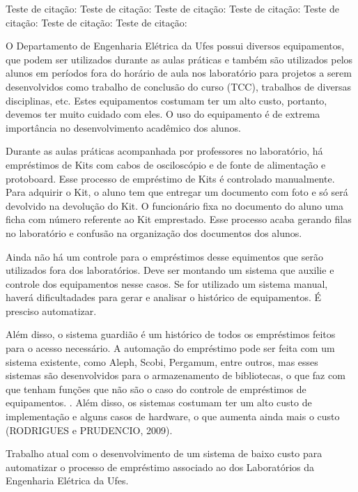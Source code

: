 \vspace{-42pt}
Teste de citação: \cite{DepEngEle}
Teste de citação: \cite{SistEmprestimo}
Teste de citação: \cite{Laravel}
Teste de citação: \cite{Cake}
Teste de citação: \cite{Software}
Teste de citação: \cite{LandItens}
Teste de citação: \cite{SistBib}

O Departamento de Engenharia Elétrica da Ufes possui diversos equipamentos, que podem ser utilizados durante as aulas práticas e também são utilizados pelos alunos em períodos fora do horário de aula nos laboratório para projetos a serem desenvolvidos como trabalho de conclusão do curso (TCC), trabalhos de diversas disciplinas, etc. Estes equipamentos costumam ter um alto custo, portanto, devemos ter muito cuidado com eles. O uso do equipamento é de extrema importância no desenvolvimento acadêmico dos alunos.
	

Durante as aulas práticas acompanhada por professores no laboratório, há empréstimos de Kits com cabos de osciloscópio e de fonte de alimentação e protoboard. Esse processo de empréstimo de Kits é controlado manualmente. Para adquirir o Kit, o aluno tem que entregar um documento com foto e só será devolvido na devolução do Kit. O funcionário fixa no documento do aluno uma ficha com número referente ao Kit emprestado. Esse processo acaba gerando filas no laboratório e confusão na organização dos documentos dos alunos. 

Ainda não há um controle para o empréstimos desse equimentos que serão utilizados fora dos laboratórios. Deve ser montando um sistema que auxilie e controle dos equipamentos nesse casos. Se for utilizado um sistema manual, haverá dificultadades para gerar e analisar o histórico de equipamentos. É presciso automatizar.

Além disso, o sistema guardião é um histórico de todos os empréstimos feitos para o acesso necessário. A automação do empréstimo pode ser feita com um sistema existente, como Aleph, Scobi, Pergamum, entre outros, mas esses sistemas são desenvolvidos para o armazenamento de bibliotecas, o que faz com que tenham funções que não são o caso do controle de empréstimos de equipamentos. . Além disso, os sistemas costumam ter um alto custo de implementação e alguns casos de hardware, o que aumenta ainda mais o custo (RODRIGUES e PRUDENCIO, 2009).

Trabalho atual com o desenvolvimento de um sistema de baixo custo para automatizar o processo de empréstimo associado ao dos Laboratórios da Engenharia Elétrica da Ufes.